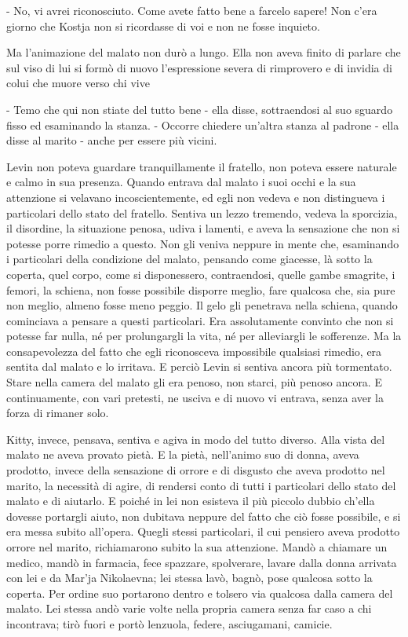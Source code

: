 - No, vi avrei riconosciuto. Come avete fatto bene a farcelo sapere! Non c'era giorno che Kostja non si ricordasse di voi e non ne fosse inquieto. 

Ma l'animazione del malato non durò a lungo. Ella non aveva finito di parlare che sul viso di lui si formò di nuovo l'espressione severa di rimprovero e di invidia di colui che muore verso chi vive 

- Temo che qui non stiate del tutto bene - ella disse, sottraendosi al suo sguardo fisso ed esaminando la stanza. - Occorre chiedere un'altra stanza al padrone - ella disse al marito - anche per essere più vicini. 

Levin non poteva guardare tranquillamente il fratello, non poteva essere naturale e calmo in sua presenza. Quando entrava dal malato i suoi occhi e la sua attenzione si velavano incoscientemente, ed egli non vedeva e non distingueva i particolari dello stato del fratello. Sentiva un lezzo tremendo, vedeva la sporcizia, il disordine, la situazione penosa, udiva i lamenti, e aveva la sensazione che non si potesse porre rimedio a questo. Non gli veniva neppure in mente che, esaminando i particolari della condizione del malato, pensando come giacesse, là sotto la coperta, quel corpo, come si disponessero, contraendosi, quelle gambe smagrite, i femori, la schiena, non fosse possibile disporre meglio, fare qualcosa che, sia pure non meglio, almeno fosse meno peggio. Il gelo gli penetrava nella schiena, quando cominciava a pensare a questi particolari. Era assolutamente convinto che non si potesse far nulla, né per prolungargli la vita, né per alleviargli le sofferenze. Ma la consapevolezza del fatto che egli riconosceva impossibile qualsiasi rimedio, era sentita dal malato e lo irritava. E perciò Levin si sentiva ancora più tormentato. Stare nella camera del malato gli era penoso, non starci, più penoso ancora. E continuamente, con vari pretesti, ne usciva e di nuovo vi entrava, senza aver la forza di rimaner solo. 

Kitty, invece, pensava, sentiva e agiva in modo del tutto diverso. Alla vista del malato ne aveva provato pietà. E la pietà, nell'animo suo di donna, aveva prodotto, invece della sensazione di orrore e di disgusto che aveva prodotto nel marito, la necessità di agire, di rendersi conto di tutti i particolari dello stato del malato e di aiutarlo. E poiché in lei non esisteva il più piccolo dubbio ch'ella dovesse portargli aiuto, non dubitava neppure del fatto che ciò fosse possibile, e si era messa subito all'opera. Quegli stessi particolari, il cui pensiero aveva prodotto orrore nel marito, richiamarono subito la sua attenzione. Mandò a chiamare un medico, mandò in farmacia, fece spazzare, spolverare, lavare dalla donna arrivata con lei e da Mar'ja Nikolaevna; lei stessa lavò, bagnò, pose qualcosa sotto la coperta. Per ordine suo portarono dentro e tolsero via qualcosa dalla camera del malato. Lei stessa andò varie volte nella propria camera senza far caso a chi incontrava; tirò fuori e portò lenzuola, federe, asciugamani, camicie. 

